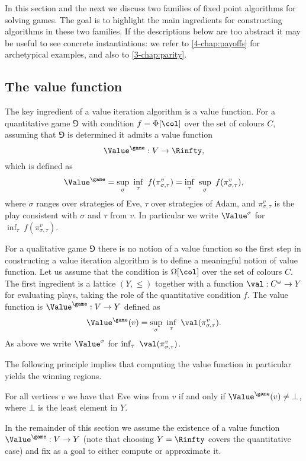 In this section and the next we discuss two families of fixed point algorithms for solving games.
The goal is to highlight the main ingredients for constructing algorithms in these two families.
If the descriptions below are too abstract it may be useful to see concrete instantiations: 
we refer to \cref{4-chap:payoffs} for archetypical examples, and also to \cref{3-chap:parity}.

\subsection*{The value function}
The key ingredient of a value iteration algorithm is a value function.
For a quantitative game $\Game$ with condition $f = \Phi[\col]$ over the set of colours $C$, 
assuming that $\Game$ is determined it admits a value function
\[
\Value^{\game} : V \to \Rinfty,
\]
which is defined as 
\[
\Value^{\game} = \sup_{\sigma}\ \inf_{\tau}\ f(\pi_{\sigma,\tau}^v) = \inf_{\tau}\ \sup_{\sigma}\ f(\pi_{\sigma,\tau}^v),
\]
where $\sigma$ ranges over strategies of Eve, $\tau$ over strategies of Adam, 
and $\pi_{\sigma,\tau}^v$ is the play consistent with $\sigma$ and $\tau$ from $v$.
In particular we write $\Value^{\sigma}$ for $\inf_{\tau}\ f(\pi_{\sigma,\tau}^v)$.

For a qualitative game $\Game$ there is no notion of a value function so the first step in constructing a value iteration
algorithm is to define a meaningful notion of value function.
Let us assume that the condition is $\Omega[\col]$ over the set of colours $C$.
The first ingredient is a lattice $(Y,\le)$ together with a function $\val : C^\omega \to Y$ for evaluating plays, taking the role of the quantitative condition $f$.
The value function is $\Value^{\game} : V \to Y$ defined as
\[
\Value^{\game}(v) = \sup_{\sigma}\ \inf_{\tau}\ \val(\pi_{\sigma,\tau}^v).
\]
As above we write $\Value^{\sigma}$ for $\inf_{\tau}\ \val(\pi_{\sigma,\tau}^v)$.

The following principle implies that computing the value function in particular yields the winning regions.

\begin{principle}
For all vertices $v$ we have that Eve wins from $v$ if and only if $\Value^{\game}(v) \neq \bot$, where $\bot$ is the least element in $Y$.
\end{principle}

In the remainder of this section we assume the existence of a value function $\Value^{\game} : V \to Y$ (note that choosing $Y = \Rinfty$ covers the quantitative case) and fix as a goal to either compute or approximate it.

